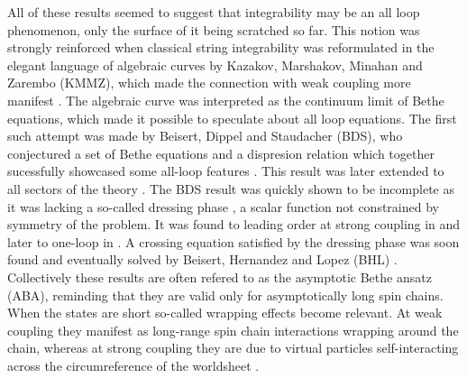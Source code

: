 All of these results seemed to suggest that integrability may be an all loop phenomenon, only the surface of it being scratched so far. 
This notion was strongly reinforced when classical string integrability was reformulated in the elegant language of algebraic curves by Kazakov, Marshakov, Minahan and Zarembo (KMMZ), which made the connection with weak coupling more manifest \cite{Kazakov:2004qf}. 
The algebraic curve was interpreted as the continuum limit of Bethe equations, which made it possible to speculate about all loop equations.
The first such attempt was made by Beisert, Dippel and Staudacher (BDS), who conjectured a set of Bethe equations and a dispresion relation which together sucessfully showcased some all-loop features \cite{Beisert:2004hm}.
This result was later extended to all sectors of the theory \cite{Beisert:2005fw}.
The BDS result was quickly shown to be incomplete as it was lacking a so-called dressing phase \cite{Arutyunov:2004vx}, a scalar function not constrained by symmetry of the problem.
It was found to leading order at strong coupling in \cite{Arutyunov:2004vx} and later to one-loop in \cite{Hernandez:2006tk}.
A crossing equation satisfied by the dressing phase was soon found \cite{Janik:2006dc} and eventually solved by Beisert, Hernandez and Lopez (BHL) \cite{Beisert:2006ib}.  
Collectively these results are often refered to as the asymptotic Bethe ansatz (ABA), reminding that they are valid only for asymptotically long spin chains. 
When the states are short so-called wrapping effects become relevant. 
At weak coupling they manifest as long-range spin chain interactions wrapping around the chain, whereas at strong coupling they are due to virtual particles self-interacting across the circumreference of the worldsheet \cite{Sieg:2005kd, Ambjorn:2005wa}.

\vspace{20pt}
\vspace{20pt}

